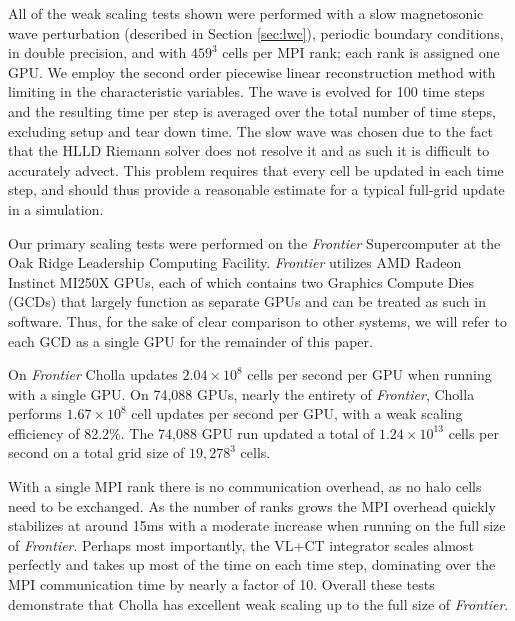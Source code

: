 All of the weak scaling tests shown were performed with a slow magnetosonic wave perturbation (described in Section \ref{sec:lwc}), periodic boundary conditions, in double precision, and with $459^3$ cells per MPI rank; each rank is assigned one GPU. We employ the second order piecewise linear reconstruction method with limiting in the characteristic variables. The wave is evolved for 100 time steps and the resulting time per step is averaged over the total number of time steps, excluding setup and tear down time. The slow wave was chosen due to the fact that the HLLD Riemann solver does not resolve it and as such it is difficult to accurately advect. This problem requires that every cell be updated in each time step, and should thus provide a reasonable estimate for a typical full-grid update in a simulation.

Our primary scaling tests were performed on the \textit{Frontier} Supercomputer at the Oak Ridge Leadership Computing Facility. \textit{Frontier} utilizes AMD Radeon Instinct MI250X GPUs, each of which contains two Graphics Compute Dies (GCDs) that largely function as separate GPUs and can be treated as such in software. Thus, for the sake of clear comparison to other systems, we will refer to each GCD as a single GPU for the remainder of this paper. 

On \textit{Frontier} Cholla updates $2.04\times10^8$ cells per second per GPU when running with a single GPU. On 74,088 GPUs, nearly the entirety of \textit{Frontier}, Cholla performs $1.67\times10^8$ cell updates per second per GPU, with a weak scaling efficiency of 82.2\%. The 74,088 GPU run updated a total of $1.24\times10^{13}$ cells per second on a total grid size of $19,278^3$ cells.

With a single MPI rank there is no communication overhead, as no halo cells need to be exchanged. As the number of ranks grows the MPI overhead quickly stabilizes at around 15ms with a moderate increase when running on the full size of \textit{Frontier}. Perhaps most importantly, the VL+CT integrator scales almost perfectly and takes up most of the time on each time step, dominating over the MPI communication time by nearly a factor of 10. Overall these tests demonstrate that Cholla has excellent weak scaling up to the full size of \textit{Frontier}.


